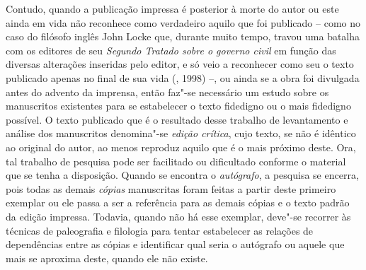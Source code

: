 Contudo, quando a publicação impressa é posterior à morte do autor ou
este ainda em vida não reconhece como verdadeiro aquilo que foi
publicado -- como no caso do filósofo inglês John Locke que, durante
muito tempo, travou uma batalha com os editores de seu \emph{Segundo
Tratado sobre o governo civil} em função das diversas alterações
inseridas pelo editor, e só veio a reconhecer como seu o texto publicado
apenas no final de sua vida (, 1998) --, ou ainda se a obra foi
divulgada antes do advento da imprensa, então faz"-se necessário um
estudo sobre os manuscritos existentes para se estabelecer o texto
fidedigno ou o mais fidedigno possível. O texto publicado que é o
resultado desse trabalho de levantamento e análise dos manuscritos
denomina"-se \emph{edição crítica}, cujo texto, se não é idêntico ao
original do autor, ao menos reproduz aquilo que é o mais próximo deste.
Ora, tal trabalho de pesquisa pode ser facilitado ou dificultado
conforme o material que se tenha a disposição. Quando se encontra o
\emph{autógrafo}, a pesquisa se encerra, pois todas as demais
\emph{cópias} manuscritas foram feitas a partir deste primeiro exemplar
ou ele passa a ser a referência para as demais cópias e o texto padrão
da edição impressa. Todavia, quando não há esse exemplar, deve"-se
recorrer às técnicas de paleografia e filologia para tentar estabelecer
as relações de dependências entre as cópias e identificar qual seria o
autógrafo ou aquele que mais se aproxima deste, quando ele não existe.

